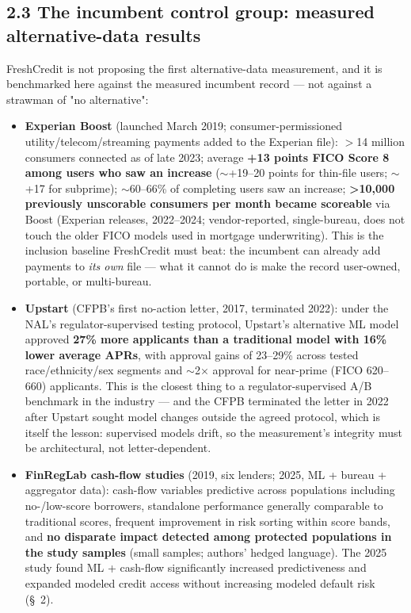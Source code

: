 \documentclass[11pt,twocolumn]{article}
\begin{document}
\subsection*{2.3 The incumbent control group: measured alternative-data results}

FreshCredit is not proposing the first alternative-data measurement, and it is benchmarked here against the measured incumbent record --- not against a strawman of "no alternative":

\begin{itemize}
\item \textbf{Experian Boost} (launched March 2019; consumer-permissioned utility/telecom/streaming payments added to the Experian file): $>$14 million consumers connected as of late 2023; average \textbf{+13 points FICO Score 8 among users who saw an increase} ($\sim$+19--20 points for thin-file users; $\sim$+17 for subprime); $\sim$60--66\% of completing users saw an increase; \textbf{>10,000 previously unscorable consumers per month became scoreable} via Boost (Experian releases, 2022--2024; vendor-reported, single-bureau, does not touch the older FICO models used in mortgage underwriting). This is the inclusion baseline FreshCredit must beat: the incumbent can already add payments to \emph{its own} file --- what it cannot do is make the record user-owned, portable, or multi-bureau.
\item \textbf{Upstart} (CFPB's first no-action letter, 2017, terminated 2022): under the NAL's regulator-supervised testing protocol, Upstart's alternative ML model approved \textbf{27\% more applicants than a traditional model with 16\% lower average APRs}, with approval gains of 23--29\% across tested race/ethnicity/sex segments and $\sim$2$\times$ approval for near-prime (FICO 620--660) applicants. This is the closest thing to a regulator-supervised A/B benchmark in the industry --- and the CFPB terminated the letter in 2022 after Upstart sought model changes outside the agreed protocol, which is itself the lesson: supervised models drift, so the measurement's integrity must be architectural, not letter-dependent.
\item \textbf{FinRegLab cash-flow studies} (2019, six lenders; 2025, ML + bureau + aggregator data): cash-flow variables predictive across populations including no-/low-score borrowers, standalone performance generally comparable to traditional scores, frequent improvement in risk sorting within score bands, and \textbf{no disparate impact detected among protected populations in the study samples} (small samples; authors' hedged language). The 2025 study found ML + cash-flow significantly increased predictiveness and expanded modeled credit access without increasing modeled default risk (\S~2).

\end{itemize}
\end{document}
